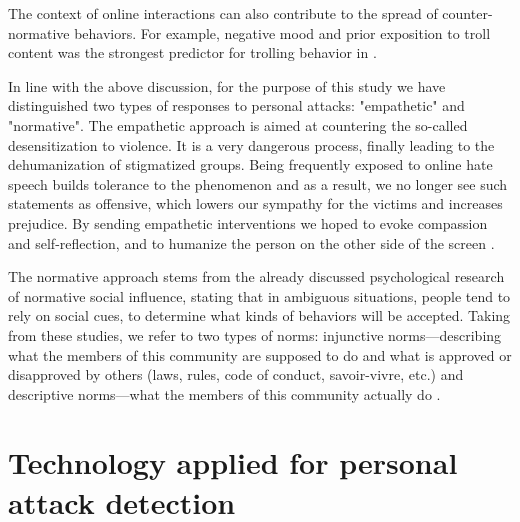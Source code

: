\documentclass[preprint,12pt]{elsarticle}
\begin{document}
The context of online interactions can also contribute to the spread of counter-normative behaviors. For example, negative mood and prior exposition to troll content was the strongest predictor for trolling behavior in \citep{cheng2017anyone}.


 
In line with the above discussion, for the purpose of this study we have distinguished two types of responses to personal attacks: "empathetic" and "normative". The empathetic approach is aimed at countering the so-called desensitization to violence. It is a very dangerous process, finally leading to the dehumanization of stigmatized groups.  
 Being frequently exposed to online hate speech builds tolerance to the phenomenon and as a result, we no longer see such statements as offensive, which lowers our sympathy for the victims and increases prejudice. By sending empathetic interventions we hoped to evoke compassion and self-reflection, and  to humanize the person on the other side of the screen \citep{bilewicz2021artificial}. 

The normative approach stems from the  already discussed psychological research of normative social influence, stating that in ambiguous situations, people tend to rely on social cues, to determine what kinds of behaviors will be accepted. Taking from these studies, we refer to two types of norms: injunctive norms---describing what the members of this community are supposed to do and what is approved or disapproved by others (laws, rules, code of conduct, savoir-vivre, etc.) and descriptive norms---what the members of this community actually do \citep{cialdini_focus_1991, cialdini2004social, cialdini2006managing}. 






\section{Technology applied for personal attack detection}
\label{sec:technology}
\end{document}

